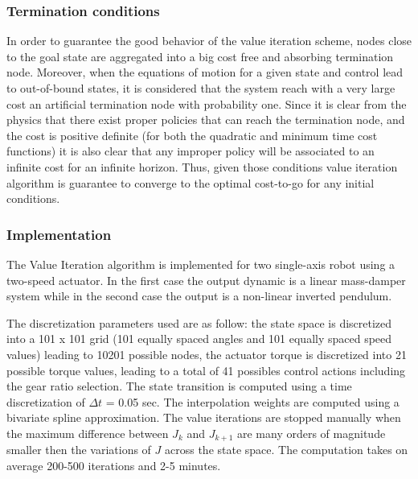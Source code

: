 \subsubsection{Termination conditions}
\label{sec:TerminationCondtions}

In order to guarantee the good behavior of the value iteration scheme, nodes close to the goal state are aggregated into a big cost free and absorbing termination node.  Moreover, when the equations of motion for a given state and control lead to out-of-bound states, it is considered that the system reach with a very large cost an artificial termination node with probability one. Since it is clear from the physics that there exist proper policies that can reach the termination node, and the cost is positive definite (for both the quadratic and minimum time cost functions) it is also clear that any improper policy will be associated to an infinite cost for an infinite horizon. Thus, given those conditions value iteration algorithm is guarantee to converge to the optimal cost-to-go for any initial conditions.

\subsubsection{Implementation}
\label{sec:Methodology}


The Value Iteration algorithm is implemented for two single-axis robot using a two-speed actuator. In the first case the output dynamic is a linear mass-damper system while in the second case the output is a non-linear inverted pendulum. 

The discretization parameters used are as follow: the state space is discretized into a 101 x 101 grid (101 equally spaced angles and 101 equally spaced speed values) leading to 10201 possible nodes, the actuator torque is discretized into 21 possible torque values, leading to a total of 41 possibles control actions including the gear ratio selection. The state transition is computed using a time discretization of $\Delta t$ = 0.05 sec. The interpolation weights are computed using a bivariate spline approximation. The value iterations are stopped manually when the maximum difference between $J_k$ and $J_{k+1}$ are many orders of magnitude smaller then the variations of $J$ across the state space. The computation takes on average 200-500 iterations and 2-5 minutes.

